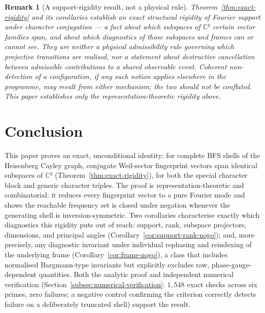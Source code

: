 \documentclass[11pt,a4paper]{article}
\newtheorem{remark}[theorem]{Remark}
\begin{document}
  \begin{remark}[A support-rigidity result, not a physical rule]
    \label{rem:not-admissibility-not-cancellation}
    Theorem~\ref{thm:exact-rigidity} and its corollaries establish an exact structural rigidity of
    Fourier support under character conjugation --- a fact about which subspaces of $\mathbb{C}^q$
    certain vector families span, and about which diagnostics of those subspaces and frames can or
    cannot see. They are neither a physical admissibility rule governing which projective transitions
    are realised, nor a statement about destructive cancellation between admissible contributions to
    a shared observable event. Coherent non-detection of a configuration, if any such notion applies
    elsewhere in the programme, may result from either mechanism; the two should not be conflated.
    This paper establishes only the representation-theoretic rigidity above.
  \end{remark}


  \section{Conclusion}
  \label{sec:conclusion}

  This paper proves an exact, unconditional identity: for complete BFS shells of the Heisenberg
  Cayley graph, conjugate Weil-sector fingerprint vectors span identical subspaces of
  $\mathbb{C}^q$ (Theorem~\ref{thm:exact-rigidity}), for both the special character block and
  generic character triples. The proof is representation-theoretic and combinatorial: it reduces
  every fingerprint vector to a pure Fourier mode and shows the reachable frequency set is closed
  under negation whenever the generating shell is inversion-symmetric. Two corollaries characterise
  exactly which diagnostics this rigidity puts out of reach: support, rank, subspace projectors,
  dimensions, and principal angles (Corollary~\ref{cor:support-rank-nogo}); and, more precisely,
  any diagnostic invariant under individual rephasing and reindexing of the underlying frame
  (Corollary~\ref{cor:frame-nogo}), a class that includes normalised Bargmann-type invariants but
  explicitly excludes raw, phase-gauge-dependent quantities. Both the analytic proof and independent
  numerical verification (Section~\ref{subsec:numerical-verification}: $1{,}548$ exact checks across
  six primes, zero failures; a negative control confirming the criterion correctly detects failure on
  a deliberately truncated shell) support the result.
\end{document}

